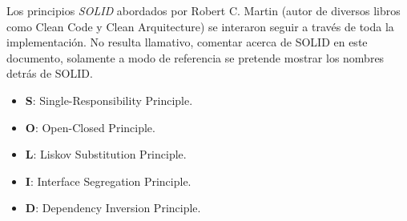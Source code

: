 Los principios \textit{SOLID} abordados por Robert C. Martin (autor de diversos libros como Clean Code y Clean Arquitecture) se interaron seguir a través de toda la implementación. No resulta llamativo, comentar acerca de SOLID en este documento, solamente a modo de referencia se pretende mostrar los nombres detrás de SOLID.\cite{solid_medium}
\begin{itemize}
	\item \textbf{S}: Single-Responsibility Principle.
	\item \textbf{O}: Open-Closed Principle.
	\item \textbf{L}: Liskov Substitution Principle.
	\item \textbf{I}: Interface Segregation Principle.
	\item \textbf{D}: Dependency Inversion Principle.
\end{itemize}

\nocite{thesis_joel}



